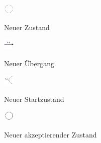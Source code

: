 \begin{figure}[h!]
  \begin{center}
    \begin{minipage}[t]{1cm}
      \includegraphics[width=0.5cm]{../images/machineToolbar/state.png}
    \end{minipage}
    \begin{minipage}[t]{5cm}
      Neuer Zustand
    \end{minipage}
  \end{center}
\end{figure} 

\begin{figure}[h!]
  \begin{center}
    \begin{minipage}[t]{1cm}
      \includegraphics[width=0.5cm]{../images/machineToolbar/transition.png}
    \end{minipage}
    \begin{minipage}[t]{5cm}
      Neuer Übergang
    \end{minipage}
  \end{center}
\end{figure} 

\begin{figure}[h!]
  \begin{center}
    \begin{minipage}[t]{1cm}
      \includegraphics[width=0.5cm]{../images/machineToolbar/start.png}
    \end{minipage}
    \begin{minipage}[t]{5cm}
      Neuer Startzustand
    \end{minipage}
  \end{center}
\end{figure}

\begin{figure}[h!]
  \begin{center}
    \begin{minipage}[t]{1cm}
      \includegraphics[width=0.5cm]{../images/machineToolbar/final.png}
    \end{minipage}
    \begin{minipage}[t]{5cm}
      Neuer akzeptierender Zustand
    \end{minipage}
  \end{center}
\end{figure} 


